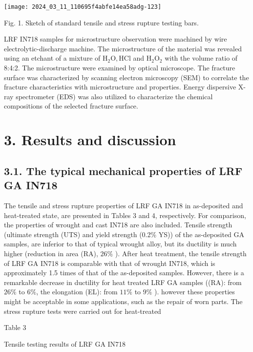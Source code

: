 \documentclass[10pt]{article}
\begin{document}
\begin{center}
\texttt{[image: 2024\_03\_11\_110695f4abfe14ea58adg-123]}
\end{center}

Fig. 1. Sketch of standard tensile and stress rupture testing bars.

LRF IN718 samples for microstructure observation were machined by wire electrolytic-discharge machine. The microstructure of the material was revealed using an etchant of a mixture of $\mathrm{H}_{2} \mathrm{O}, \mathrm{HCl}$ and $\mathrm{H}_{2} \mathrm{O}_{2}$ with the volume ratio of 8:4:2. The microstructure were examined by optical microscope. The fracture surface was characterized by scanning electron microscopy (SEM) to correlate the fracture characteristics with microstructure and properties. Energy dispersive X-ray spectrometer (EDS) was also utilized to characterize the chemical compositions of the selected fracture surface.

\section*{3. Results and discussion}
\subsection*{3.1. The typical mechanical properties of LRF GA IN718}
The tensile and stress rupture properties of LRF GA IN718 in as-deposited and heat-treated state, are presented in Tables 3 and 4, respectively. For comparison, the properties of wrought and cast IN718 are also included. Tensile strength (ultimate strength (UTS) and yield strength (0.2\% YS)) of the as-deposited GA samples, are inferior to that of typical wrought alloy, but its ductility is much higher (reduction in area (RA), $26 \%$ ). After heat treatment, the tensile strength of LRF GA IN718 is comparable with that of wrought IN718, which is approximately 1.5 times of that of the as-deposited samples. However, there is a remarkable decrease in ductility for heat treated LRF GA samples ((RA): from $26 \%$ to $6 \%$, the elongation (EL): from $11 \%$ to $9 \%$ ). however these properties might be acceptable in some applications, such as the repair of worn parts. The stress rupture tests were carried out for heat-treated

Table 3

Tensile testing results of LRF GA IN718
\end{document}
